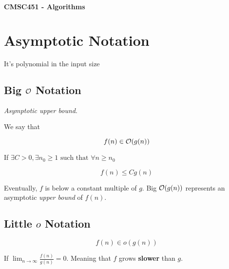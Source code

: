 \documentclass[12pt]{article}
\begin{document}
  \begin{center}
    {\bf CMSC451 - Algorithms}
  \end{center}

  \vspace{0.7cm}

  \tableofcontents



  \newpage

  \section{Asymptotic Notation}

  {
    It's polynomial in the input size
  }


  \subsection{Big $\mathcal O$ Notation}
  {\it Asymptotic upper bound}.

  We say that

  \[
    f(n) \in \mathcal O(g(n))
  \]

  If $\exists C > 0, \exists n_0 \ge 1 \text{ such that } \forall n \ge n_0$

  \[
    f(n) \le Cg(n)
  \]

  Eventually, $f$ is below a constant multiple of $g$. Big $\mathcal O(g(n))$ represents
  an asymptotic {\it upper bound} of $f(n)$.




  \subsection{Little $o$ Notation}

  \[
    f(n) \in o(g(n))
  \]

  If $\lim_{n \to \infty} \frac{f(n)}{g(n)} = 0$. Meaning that $f$ grows
  {\bf slower} than $g$.


\end{document}
